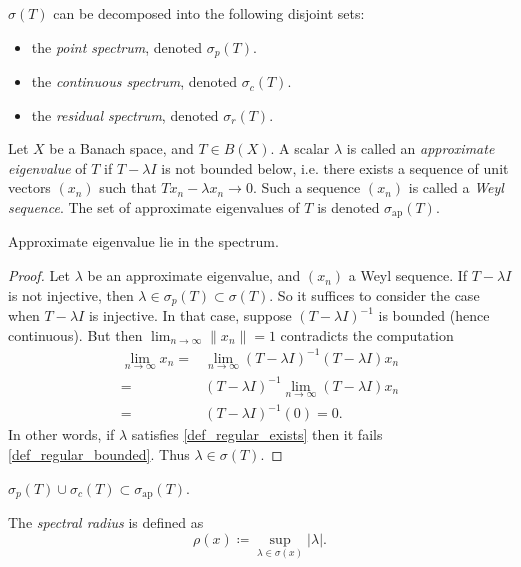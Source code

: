 \documentclass[12pt]{article}
\begin{document}
\begin{refsection}
\begin{definition}
	$\sigma(T)$ can be decomposed into the following disjoint sets:
	\begin{itemize}
		\item the \emph{point spectrum}, denoted $\sigma_p(T)$.
		\item the \emph{continuous spectrum}, denoted $\sigma_c(T)$.
		\item the \emph{residual spectrum}, denoted $\sigma_r(T)$.
	\end{itemize}
\end{definition}

\begin{definition} %
	Let $X$ be a Banach space, and $T\in B(X)$. A scalar $\lambda$ is called an \emph{approximate eigenvalue} of $T$ if $T-\lambda I$ is not bounded below, i.e. there exists a sequence of unit vectors $(x_n)$ such that $Tx_n-\lambda x_n \to 0$. Such a sequence $(x_n)$ is called a \emph{Weyl sequence}. The set of approximate eigenvalues of $T$ is denoted $\sigma_{\text{ap}}(T)$.
\end{definition}

\begin{proposition}
	Approximate eigenvalue lie in the spectrum. 
\end{proposition}
\begin{proof}
	Let $\lambda$ be an approximate eigenvalue, and $(x_n)$ a Weyl sequence. If $T-\lambda I$ is not injective, then $\lambda\in\sigma_p(T)\subset\sigma(T)$. So it suffices to consider the case when $T-\lambda I$ is injective. In that case, suppose $(T-\lambda I)^{-1}$ is bounded (hence continuous). But then $\lim_{n\to\infty} \|x_n\| = 1$ contradicts the computation
	\begin{align*}
		\lim_{n\to\infty} x_n 
		=& \lim_{n\to\infty} (T-\lambda I)^{-1}(T-\lambda I)x_n \\
		=& (T-\lambda I)^{-1}\lim_{n\to\infty} (T-\lambda I)x_n \\
		=& (T - \lambda I)^{-1} (0) = 0.
	\end{align*}
	In other words, if $\lambda$ satisfies \ref{def_regular_exists} then it fails \ref{def_regular_bounded}. Thus $\lambda\in\sigma(T)$.
\end{proof}

\begin{corollary}
	$\sigma_p(T) \cup \sigma_c(T) \subset \sigma_{\text{ap}}(T)$.
\end{corollary}

\begin{definition}
	The \emph{spectral radius} is defined as 
	\begin{equation*}
		\rho(x) \coloneqq \sup_{\lambda \in \sigma(x)} |\lambda|.
	\end{equation*}
\end{definition}




\nocite{pm_resolvent_analytic}
\nocite{se_spectral_radius_equals}
\printbibliography

\end{refsection}
\end{document}
